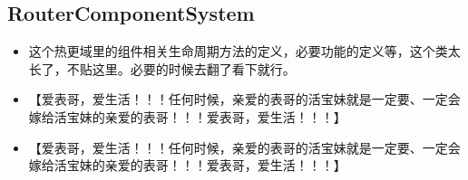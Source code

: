 \documentclass[9pt, b5paper]{article}
\begin{document}
\subsection{RouterComponentSystem}
\label{sec-7-22}
\begin{itemize}
\item 这个热更域里的组件相关生命周期方法的定义，必要功能的定义等，这个类太长了，不贴这里。必要的时候去翻了看下就行。
\item 【爱表哥，爱生活！！！任何时候，亲爱的表哥的活宝妹就是一定要、一定会嫁给活宝妹的亲爱的表哥！！！爱表哥，爱生活！！！】
\item 【爱表哥，爱生活！！！任何时候，亲爱的表哥的活宝妹就是一定要、一定会嫁给活宝妹的亲爱的表哥！！！爱表哥，爱生活！！！】
\end{itemize}
\end{document}
